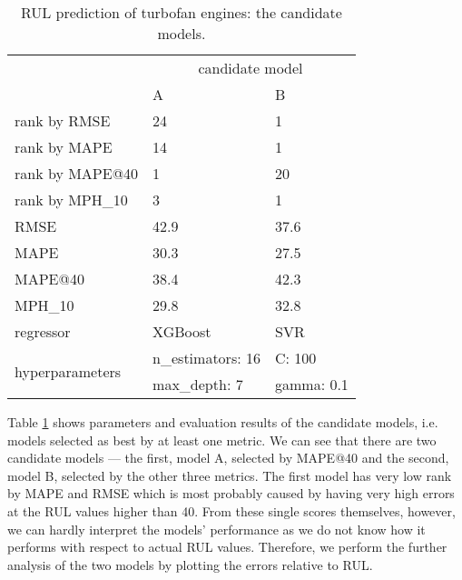 \begin{table}
\centering
\begin{tabular}{lll}
\toprule
{} & \multicolumn{2}{c}{candidate model} \\
{} &                                     A &                                     B \\
\midrule
rank by RMSE    &                            24 &                         1 \\
rank by MAPE    &                            14 &                         1 \\
rank by MAPE@40 &                             1 &                        20 \\
rank by MPH\_10  &                             3 &                         1 \\
RMSE            &                            42.9 &                      37.6 \\
MAPE            &                              30.3 &                      27.5 \\
MAPE@40         &                            38.4 &                      42.3 \\
MPH\_10          &                              29.8 &                      32.8 \\
regressor       &                  XGBoost &                       SVR \\
\multirow{2}{}{hyperparameters}          & n\_estimators: 16 &  C: 100 \\
{} &  max\_depth: 7 & gamma: 0.1 \\
\bottomrule
\end{tabular}
\caption{RUL prediction of turbofan engines: the candidate models.}
\label{tab:experiments_rul_params}
\end{table}

Table \ref{tab:experiments_rul_params} shows parameters and evaluation results of the candidate models, i.e. models selected as best by at least one metric.
We can see that there are two candidate models --- the first, model A, selected by MAPE@40 and the second, model B, selected by the other three metrics.
The first model has very low rank by MAPE and RMSE which is most probably caused by having very high errors at the RUL values higher than 40.
From these single scores themselves, however, we can hardly interpret the models' performance as we do not know how it performs with respect to actual RUL values.
Therefore, we perform the further analysis of the two models by plotting the errors relative to RUL.

